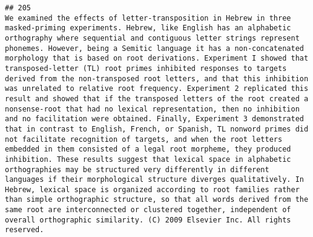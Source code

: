 \documentclass[
  english,
  man]{apa6}
\begin{document}
\begin{verbatim}
## 205                                                                                                                                                                                                                                                                                                                                                                                                                                                                                                                                                                                                                                                                                                                                                                                                                                                                                                                                                                                                                                                                                                                                                                  We examined the effects of letter-transposition in Hebrew in three masked-priming experiments. Hebrew, like English has an alphabetic orthography where sequential and contiguous letter strings represent phonemes. However, being a Semitic language it has a non-concatenated morphology that is based on root derivations. Experiment I showed that transposed-letter (TL) root primes inhibited responses to targets derived from the non-transposed root letters, and that this inhibition was unrelated to relative root frequency. Experiment 2 replicated this result and showed that if the transposed letters of the root created a nonsense-root that had no lexical representation, then no inhibition and no facilitation were obtained. Finally, Experiment 3 demonstrated that in contrast to English, French, or Spanish, TL nonword primes did not facilitate recognition of targets, and when the root letters embedded in them consisted of a legal root morpheme, they produced inhibition. These results suggest that lexical space in alphabetic orthographies may be structured very differently in different languages if their morphological structure diverges qualitatively. In Hebrew, lexical space is organized according to root families rather than simple orthographic structure, so that all words derived from the same root are interconnected or clustered together, independent of overall orthographic similarity. (C) 2009 Elsevier Inc. All rights reserved.

\end{verbatim}
\end{document}
